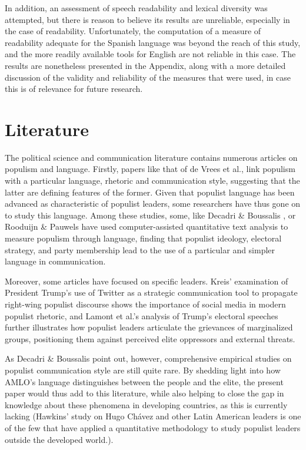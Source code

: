 \documentclass[]{article}
\begin{document}
In addition, an assessment of speech readability and lexical diversity was attempted, but there is reason to believe its results are unreliable, especially in the case of readability. Unfortunately, the computation of a measure of readability adequate for the Spanish language was beyond the reach of this study, and the more readily available tools for English are not reliable in this case. The results are nonetheless presented in the Appendix, along with a more detailed discussion of the validity and reliability of the measures that were used, in case this is of relevance for future research. 

\section{Literature}

The political science and communication literature contains numerous articles on populism and language. Firstly, papers like that of de Vrees et al., \cite{de_vreese_populism_2018} link populism with a particular language, rhetoric and communication style, suggesting that the latter are defining features of the former. Given that populist language has been advanced as characteristic of populist leaders, some researchers have thus gone on to study this language. Among these studies, some, like Decadri \& Boussalis \cite{decadri_populism_2020} , or Rooduijn \& Pauwels \cite{rooduijn_measuring_2011} have used computer-assisted quantitative text analysis to measure populism through language, finding that populist ideology, electoral strategy, and party membership lead to the use of a particular and simpler language in communication. 

Moreover, some articles have focused on specific leaders. Kreis' \cite{kreis_tweet_2017} examination of President Trump's use of Twitter as a strategic communication tool to propagate right-wing populist discourse shows the importance of social media in modern populist rhetoric, and Lamont et al.'s \cite{lamont_trumps_2017} analysis of Trump's electoral speeches further illustrates how populist leaders articulate the grievances of marginalized groups, positioning them against perceived elite oppressors and external threats.

As Decadri \& Boussalis \cite{decadri_populism_2020} point out, however, comprehensive empirical studies on populist communication style are still quite rare. By shedding light into how AMLO's language distinguishes between the people and the elite, the present paper would thus add to this literature, while also helping to close the gap in knowledge about these phenomena in developing countries, as this is currently lacking (Hawkins' \cite{hawkins_is_2009} study on Hugo Chávez and other Latin American leaders is one of the few that have applied a quantitative methodology to study populist leaders outside the developed world.). 
\end{document}
